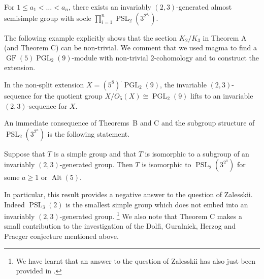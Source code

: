 \documentclass[12pt,a4paper]{amsart}
\DeclareMathOperator{\PGL}{PGL}
\DeclareMathOperator{\PSL}{PSL}
\DeclareMathOperator{\Alt}{Alt}
\DeclareMathOperator{\GF}{GF}
\begin{document}
\begin{remark} For $1\le a_1< \dots< a_n$, there exists an invariably $(2,3)$-generated almost semisimple group with socle $\prod_{i=1}^n \PSL_2(3^{2^{a_i}})$.
\end{remark}



The following example explicitly shows that the section $K_2/K_3$ in Theorem A (and Theorem C) can be non-trivial. We comment that we used {\sc magma} \cite{Magma} to find a $\GF(5)\PGL_2(9)$-module with non-trivial $2$-cohomology and to construct the extension.

\begin{example} In the non-split extension $X=(5^8)^.\PGL_2(9)$, the  invariable $(2,3)$-sequence for the quotient group $X/O_5(X)\cong \PGL_2(9)$ lifts to an invariable $(2,3)$-sequence for $X$.
\end{example}


An immediate consequence of Theorems~B  and C and the subgroup structure of $\PSL_2(3^{2^a})$ is the following statement.

\begin{corollary}\label{cor:Zalesskii Q}
  Suppose that $T$ is a simple group and that $T$ is isomorphic to a subgroup of an invariably $(2,3)$-generated group. Then $T$ is isomorphic  to $\PSL_2(3^{2^a})$ for some $a \ge 1$ or $\Alt(5)$.
 \end{corollary}

In particular, this result provides a negative answer to the question of Zalesskii. Indeed  $\PSL_3(2)$ is the smallest simple group which does not embed into an invariably $(2,3)$-generated group. \footnote{We have learnt that an answer to the question of Zalesskii has also just  been provided in \cite{YY}.}
We also note that   Theorem C makes a small contribution to the investigation of the  Dolfi, Guralnick,  Herzog  and Praeger conjecture mentioned above.
\end{document}
